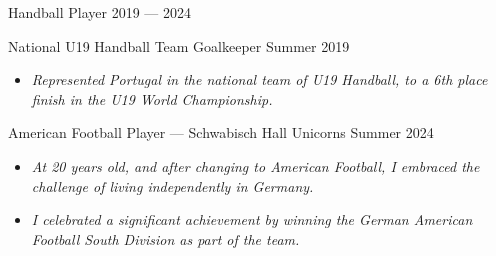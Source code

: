 Handball Player	\hfill 2019 --- 2024
 
National U19 Handball Team Goalkeeper \hfill Summer 2019
\begin{itemize}[noitemsep, leftmargin=1em, label={}]
    \item \textit{\textcolor{black!60}{Represented Portugal in the national team of U19 Handball, to a 6th place finish in the U19 World Championship.}}
\end{itemize}

American Football Player — Schwabisch Hall Unicorns \hfill Summer 2024
\begin{itemize}[noitemsep, leftmargin=1em, label={}]
    \item \textit{\textcolor{black!60}{At 20 years old, and after changing to American Football, I embraced the challenge of living
independently in Germany. }}
    \item \textit{\textcolor{black!60}{I celebrated a significant achievement by winning the German
American Football South Division as part of the team. }}
\end{itemize}


